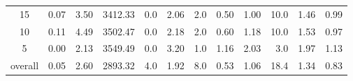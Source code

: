 \begin{table}[H]
\begin{tabular}{c rrrr rr rrr rr}
      15 &           0.07 &        3.50 &    3412.33 &  0.0 &          2.06 &      2.0 &          0.50 &          1.00 &     10.0 &             1.46 & 0.99 \\
      10 &           0.11 &        4.49 &    3502.47 &  0.0 &          2.18 &      2.0 &          0.60 &          1.18 &     10.0 &             1.53 & 0.97 \\
       5 &           0.00 &        2.13 &    3549.49 &  0.0 &          3.20 &      1.0 &          1.16 &          2.03 &      3.0 &             1.97 & 1.13 \\
\midrule
 overall &           0.05 &        2.60 &    2893.32 &  4.0 &          1.92 &      8.0 &          0.53 &          1.06 &     18.4 &             1.34 & 0.83 \\
\bottomrule
\end{tabular}
\end{table}